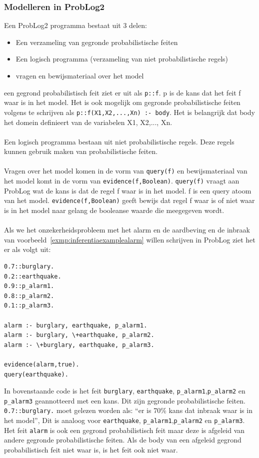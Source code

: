 \documentclass[12pt,a4paper,oneside]{book}
\theoremstyle{definition}
\newcommand{\quotes}[1]{``#1''}
\begin{document}
\subsubsection{Modelleren in ProbLog2}
\label{subsubsec:ModellereninProbLog2}
Een ProbLog2 programma bestaat uit 3 delen:
\begin{itemize}
	\item Een verzameling van gegronde probabilistische feiten
	\item Een logisch programma (verzameling van niet probabilistische regels)
	\item vragen en bewijsmateriaal over het model
\end{itemize}
een gegrond probabilistisch feit ziet er uit als \lstinline{p::f}. p is de kans dat het feit f waar is in het model. Het is ook mogelijk om gegronde probabilistische feiten volgens te schrijven als \lstinline{p::f(X1,X2,...,Xn) :- body}. Het is belangrijk dat body het domein definieert van de variabelen X1, X2,..., Xn.
\\\\
Een logisch programma bestaan uit niet probabilistische regels. Deze regels kunnen gebruik maken van probabilistische feiten.
\\\\
Vragen over het model komen in de vorm van \lstinline{query(f)} en bewijsmateriaal van het model komt in de vorm van \lstinline{evidence(f,Boolean)}. \lstinline{query(f)} vraagt aan ProbLog wat de kans is dat de regel f waar is in het model. f is een query atoom van het model. \lstinline{evidence(f,Boolean)} geeft bewijs dat regel f waar is of niet waar is in het model naar gelang de booleanse waarde die meegegeven wordt.
\\\\
Als we het onzekerheidsprobleem met het alarm en de aardbeving en de inbraak van voorbeeld~\ref{exmp:inferentiaexamplealarm} willen schrijven in ProbLog ziet het er als volgt uit:
\begin{lstlisting}
0.7::burglary.
0.2::earthquake.
0.9::p_alarm1.
0.8::p_alarm2.
0.1::p_alarm3.

alarm :- burglary, earthquake, p_alarm1.
alarm :- burglary, \+earthquake, p_alarm2.
alarm :- \+burglary, earthquake, p_alarm3.

evidence(alarm,true).
query(earthquake).
\end{lstlisting}
In bovenstaande code is het feit \lstinline{burglary}, \lstinline{earthquake}, \lstinline{p_alarm1},\lstinline{p_alarm2} en \lstinline{p_alarm3} geannotteerd met een kans. Dit zijn gegronde probabilistische feiten. \lstinline{0.7::burglary.} moet gelezen worden als: \quotes{er is 70\% kans dat inbraak waar is in het model}, Dit is analoog voor \lstinline{earthquake}, \lstinline{p_alarm1},\lstinline{p_alarm2} en \lstinline{p_alarm3}. Het feit \lstinline{alarm} is ook een gegrond probabilistisch feit maar deze is afgeleid van andere gegronde probabilistische feiten. Als de body van een afgeleid gegrond probabilistisch feit niet waar is, is het feit ook niet waar.
\end{document}
